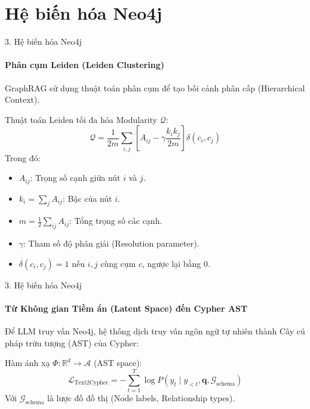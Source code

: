 \documentclass[aspectratio=169,xcolor=table]{beamer}
\begin{document}
\section{Hệ biến hóa Neo4j}

\begin{frame}{3. Hệ biến hóa Neo4j}
    \framesubtitle{Phân cụm Leiden (Leiden Clustering)}
    GraphRAG sử dụng thuật toán phân cụm để tạo bối cảnh phân cấp (Hierarchical Context).
    
    Thuật toán Leiden tối đa hóa Modularity $\mathcal{Q}$:
    \begin{equation}
        \mathcal{Q} = \frac{1}{2m} \sum_{i,j} \left[ A_{ij} - \gamma \frac{k_i k_j}{2m} \right] \delta(c_i, c_j)
    \end{equation}
    Trong đó:
    \begin{itemize}
        \item $A_{ij}$: Trọng số cạnh giữa nút $i$ và $j$.
        \item $k_i = \sum_j A_{ij}$: Bậc của nút $i$.
        \item $m = \frac{1}{2} \sum_{ij} A_{ij}$: Tổng trọng số các cạnh.
        \item $\gamma$: Tham số độ phân giải (Resolution parameter).
        \item $\delta(c_i, c_j) = 1$ nếu $i, j$ cùng cụm $c$, ngược lại bằng $0$.
    \end{itemize}
\end{frame}

\begin{frame}{3. Hệ biến hóa Neo4j}
    \framesubtitle{Từ Không gian Tiềm ẩn (Latent Space) đến Cypher AST}
    Để LLM truy vấn Neo4j, hệ thống dịch truy vấn ngôn ngữ tự nhiên thành Cây cú pháp trừu tượng (AST) của Cypher:
    
    Hàm ánh xạ $\Phi: \mathbb{R}^d \rightarrow \mathcal{A}$ (AST space):
    \begin{equation}
        \mathcal{L}_{\text{Text2Cypher}} = - \sum_{t=1}^{T} \log P(y_t \mid y_{<t}, \mathbf{q}, \mathcal{G}_{\text{schema}})
    \end{equation}
    Với $\mathcal{G}_{\text{schema}}$ là lược đồ đồ thị (Node labels, Relationship types).
\end{frame}
\end{document}
